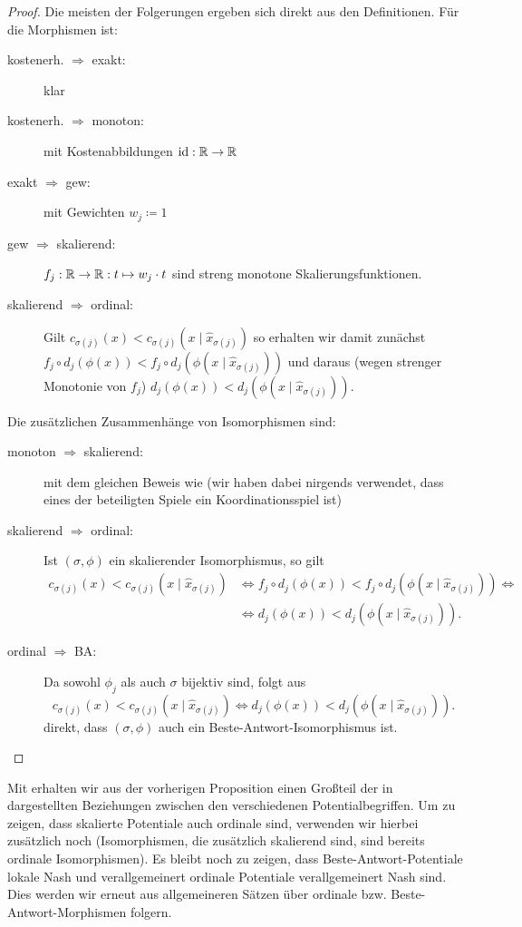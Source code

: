\begin{proof}
	Die meisten der Folgerungen ergeben sich direkt aus den Definitionen. Für die Morphismen ist:
	\begin{description}
		\item[kostenerh. $\bm{\Rightarrow}$ exakt:] klar
		\item[kostenerh. $\bm{\Rightarrow}$ monoton:] mit Kostenabbildungen $\mathrm{id}: \mathbb{R} \to \mathbb{R}$
		\item[exakt $\bm{\Rightarrow}$ gew:] mit Gewichten $w_j \coloneqq 1$
		\item[gew $\bm{\Rightarrow}$ skalierend:] $f_j: \mathbb{R} \to \mathbb{R}: t \mapsto w_j \cdot t$ sind streng monotone Skalierungsfunktionen.
		\item[skalierend $\bm{\Rightarrow}$ ordinal:] Gilt $c_{\sigma(j)}(x) < c_{\sigma(j)}(x \mid \hat{x}_{\sigma(j)})$ so erhalten wir damit zunächst $f_j \circ d_j(\phi(x)) < f_j \circ d_j(\phi(x \mid \hat{x}_{\sigma(j)}))$ und daraus (wegen strenger Monotonie von $f_j$) $d_j(\phi(x)) < d_j(\phi(x \mid \hat{x}_{\sigma(j)}))$.
	\end{description}
	Die zusätzlichen Zusammenhänge von Isomorphismen sind:
	\begin{description}
		\item[monoton $\bm{\Rightarrow}$ skalierend:] mit dem gleichen Beweis wie  (wir haben dabei nirgends verwendet, dass eines der beteiligten Spiele ein Koordinationsspiel ist)
		\item[skalierend $\bm{\Rightarrow}$ ordinal:] Ist $(\sigma, \phi)$ ein skalierender Isomorphismus, so gilt 
			\begin{align*}
				c_{\sigma(j)}(x) < c_{\sigma(j)}(x \mid \hat{x}_{\sigma(j)}) &\iff f_j \circ d_j(\phi(x)) < f_j \circ d_j(\phi(x \mid \hat{x}_{\sigma(j)})) \iff \\
																			 &\iff d_j(\phi(x)) < d_j(\phi(x \mid \hat{x}_{\sigma(j)})).
			\end{align*}
		\item[ordinal $\bm{\Rightarrow}$ BA:] Da sowohl $\phi_j$ als auch $\sigma$ bijektiv sind, folgt aus
			\[c_{\sigma(j)}(x) < c_{\sigma(j)}(x \mid \hat{x}_{\sigma(j)}) \iff d_j(\phi(x)) < d_j(\phi(x \mid \hat{x}_{\sigma(j)})).\]
			direkt, dass $(\sigma, \phi)$ auch ein Beste-Antwort-Isomorphismus ist. \qedhere
	\end{description}	
\end{proof}

Mit  erhalten wir aus der vorherigen Proposition einen Großteil der in  dargestellten Beziehungen zwischen den verschiedenen Potentialbegriffen. Um zu zeigen, dass skalierte Potentiale auch ordinale sind, verwenden wir hierbei zusätzlich noch  (Isomorphismen, die zusätzlich skalierend sind, sind bereits ordinale Isomorphismen). Es bleibt noch zu zeigen, dass Beste-Antwort-Potentiale lokale Nash und verallgemeinert ordinale Potentiale verallgemeinert Nash sind. Dies werden wir erneut aus allgemeineren Sätzen über ordinale bzw. Beste-Antwort-Morphismen folgern.

